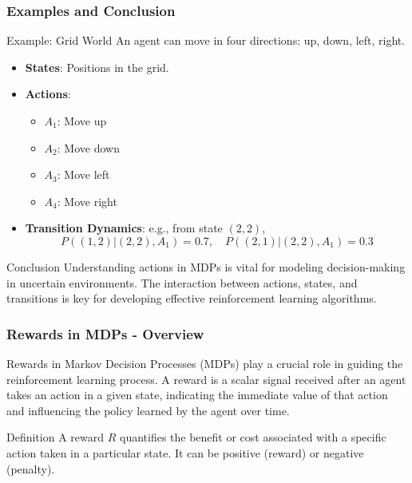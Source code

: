 \documentclass[aspectratio=169]{beamer}
\begin{document}
\begin{frame}[fragile]
    \frametitle{Examples and Conclusion}
    \begin{block}{Example: Grid World}
        An agent can move in four directions: up, down, left, right.
        \begin{itemize}
            \item \textbf{States}: Positions in the grid.
            \item \textbf{Actions}:
            \begin{itemize}
                \item \( A_1 \): Move up
                \item \( A_2 \): Move down
                \item \( A_3 \): Move left
                \item \( A_4 \): Move right
            \end{itemize}
            \item \textbf{Transition Dynamics}: e.g., from state \( (2,2) \),
            \[
            P((1,2) | (2,2), A_1) = 0.7, \quad P((2,1) | (2,2), A_1) = 0.3
            \]
        \end{itemize}
    \end{block}
    
    \begin{block}{Conclusion}
        Understanding actions in MDPs is vital for modeling decision-making in uncertain environments. The interaction between actions, states, and transitions is key for developing effective reinforcement learning algorithms.
    \end{block}
\end{frame}

\begin{frame}[fragile]
    \frametitle{Rewards in MDPs - Overview}
    Rewards in Markov Decision Processes (MDPs) play a crucial role in guiding the reinforcement learning process. 
    A reward is a scalar signal received after an agent takes an action in a given state, indicating the immediate value of that action and influencing the policy learned by the agent over time.

    \begin{block}{Definition}
        A reward \( R \) quantifies the benefit or cost associated with a specific action taken in a particular state. It can be positive (reward) or negative (penalty).
    \end{block}
\end{frame}
\end{document}
